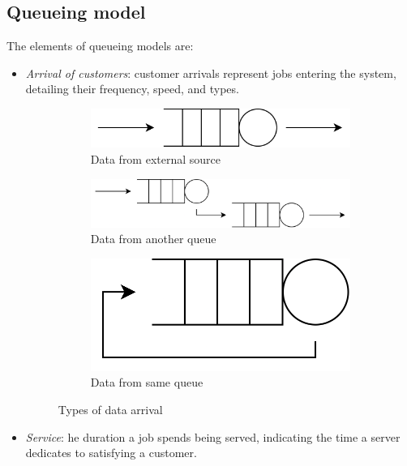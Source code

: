 \subsection{Queueing model}
The elements of queueing models are:
\begin{itemize}
    \item \textit{Arrival of customers}: customer arrivals represent jobs entering the system, detailing their frequency, speed, and types. 
        \begin{figure}[H]
            \centering
            \begin{subfigure}{0.32\textwidth}
                \centering
                \includegraphics[width=1\linewidth]{images/ext.png} 
                \caption{Data from external source}
            \end{subfigure}
            \begin{subfigure}{0.32\textwidth}
                \centering
                \includegraphics[width=1\linewidth]{images/ext1.png} 
                \caption{Data from another queue}
            \end{subfigure}
            \begin{subfigure}{0.32\textwidth}
                \centering
                \includegraphics[width=0.6\linewidth]{images/ext2.png}
                \caption{Data from same queue}
            \end{subfigure}
            \caption{Types of data arrival}
        \end{figure}
    \item \textit{Service}: he duration a job spends being served, indicating the time a server dedicates to satisfying a customer.

\end{itemize}
